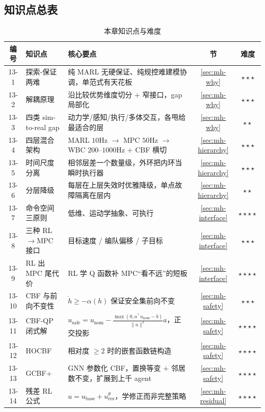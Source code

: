 \subsection*{知识点总表}
\begin{table}[H]\centering\footnotesize
\caption{本章知识点与难度}
\label{tab:mh-knowledge}
\begin{tabular}{cp{3.6cm}p{6.0cm}cc}
\toprule
编号 & 知识点 & 核心要点 & 节 & 难度 \\
\midrule
13-1 & 探索-保证两难 & 纯 MARL 无硬保证、纯规控难建模协调，单范式有天花板 & \cref{sec:mh-why} & $\star\star\star$ \\
13-2 & 解耦原理 & 沿比较优势维度切分 $+$ 窄接口，gap 局部化 & \cref{sec:mh-why} & $\star\star\star$ \\
13-3 & 四类 sim-to-real gap & 动力学/感知/执行/多体交互，各甩给最适合的层 & \cref{sec:mh-why} & $\star\star$ \\
13-4 & 四层混合架构 & MARL $10$Hz $\to$ MPC $50$Hz $\to$ WBC $200$--$1000$Hz $+$ CBF 横切 & \cref{sec:mh-hierarchy} & $\star\star\star$ \\
13-5 & 时间尺度分离 & 相邻层差一个数量级，外环把内环当瞬时执行器 & \cref{sec:mh-hierarchy} & $\star\star\star$ \\
13-6 & 分层降级 & 每层在上层失效时优雅降级，单点故障隔离在层内 & \cref{sec:mh-hierarchy} & $\star\star$ \\
13-7 & 命令空间三原则 & 低维、运动学抽象、可执行 & \cref{sec:mh-interface} & $\star\star\star\star$ \\
13-8 & 三种 RL$\to$MPC 接口 & 目标速度 / 编队偏移 / 子目标 & \cref{sec:mh-interface} & $\star\star\star$ \\
13-9 & RL 出 MPC 尾代价 & RL 学 Q 函数补 MPC“看不远”的短板 & \cref{sec:mh-interface} & $\star\star\star\star$ \\
13-10 & CBF 与前向不变性 & $\dot h\ge-\alpha(h)$ 保证安全集前向不变 & \cref{sec:mh-safety} & $\star\star\star$ \\
13-11 & CBF-QP 闭式解 & $u_{\text{safe}}=u_{\text{nom}}-\frac{\max(0,a^\top u_{\text{nom}}-b)}{\|a\|^2}a$，正交投影 & \cref{sec:mh-safety} & $\star\star\star\star$ \\
13-12 & HOCBF & 相对度 $\ge2$ 时的嵌套函数链构造 & \cref{sec:mh-safety} & $\star\star\star\star$ \\
13-13 & GCBF+ & GNN 参数化 CBF，置换等变 $+$ 邻居数不变，扩展到上千 agent & \cref{sec:mh-safety} & $\star\star\star\star$ \\
13-14 & 残差 RL 公式 & $u=u_{\text{base}}+u_{\text{res}}^{\theta}$，学修正而非完整策略 & \cref{sec:mh-residual} & $\star\star\star\star$ \\

\end{tabular}
\end{table}
